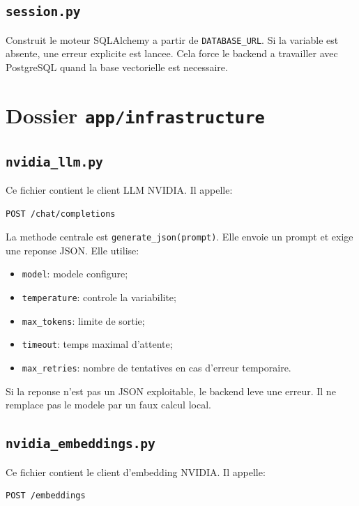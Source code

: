 \documentclass[12pt,a4paper]{article}
\begin{document}
\subsection{\texttt{session.py}}

Construit le moteur SQLAlchemy a partir de \texttt{DATABASE\_URL}. Si la variable est absente, une erreur explicite est lancee. Cela force le backend a travailler avec PostgreSQL quand la base vectorielle est necessaire.

\section{Dossier \texttt{app/infrastructure}}

\subsection{\texttt{nvidia\_llm.py}}

Ce fichier contient le client LLM NVIDIA. Il appelle:

\begin{lstlisting}[style=smartcode]
POST /chat/completions
\end{lstlisting}

La methode centrale est \texttt{generate\_json(prompt)}. Elle envoie un prompt et exige une reponse JSON. Elle utilise:

\begin{itemize}
  \item \texttt{model}: modele configure;
  \item \texttt{temperature}: controle la variabilite;
  \item \texttt{max\_tokens}: limite de sortie;
  \item \texttt{timeout}: temps maximal d'attente;
  \item \texttt{max\_retries}: nombre de tentatives en cas d'erreur temporaire.
\end{itemize}

Si la reponse n'est pas un JSON exploitable, le backend leve une erreur. Il ne remplace pas le modele par un faux calcul local.

\subsection{\texttt{nvidia\_embeddings.py}}

Ce fichier contient le client d'embedding NVIDIA. Il appelle:

\begin{lstlisting}[style=smartcode]
POST /embeddings
\end{lstlisting}
\end{document}
